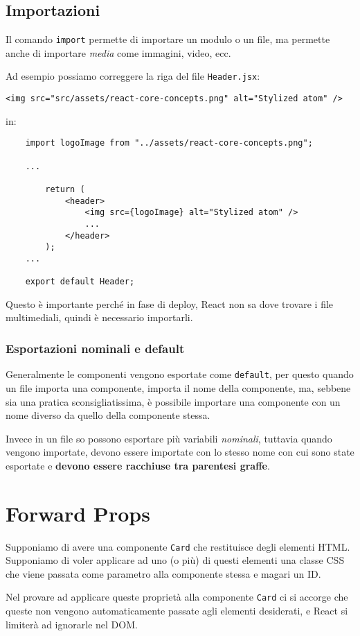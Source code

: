 \documentclass[12pt]{article}
\begin{document}
\subsection{Importazioni}
Il comando {\tt import} permette di importare un modulo o un file,
ma permette anche di importare {\it media} come immagini, video, ecc.

Ad esempio possiamo correggere la riga del file {\tt Header.jsx}:
\begin{verbatim}
<img src="src/assets/react-core-concepts.png" alt="Stylized atom" />
\end{verbatim}
in:
\begin{verbatim}
    import logoImage from "../assets/react-core-concepts.png";

    ...
    
        return (
            <header>
                <img src={logoImage} alt="Stylized atom" />
                ...
            </header>
        );
    ...
    
    export default Header;
\end{verbatim}
Questo è importante perché in fase di deploy, React non sa dove trovare i file
multimediali, quindi è necessario importarli.

\subsubsection{Esportazioni nominali e default}
Generalmente le componenti vengono esportate come {\tt default},
per questo quando un file importa una componente, importa il nome
della componente, ma, sebbene sia una pratica sconsigliatissima,
è possibile importare una componente con un nome diverso da quello
della componente stessa.

Invece in un file so possono esportare più variabili {\it nominali},
tuttavia quando vengono importate, devono essere importate con lo stesso
nome con cui sono state esportate e {\bf devono essere racchiuse tra parentesi graffe}.




\section{Forward Props}
Supponiamo di avere una componente {\tt Card} 
che restituisce degli elementi HTML. Supponiamo di voler
applicare ad uno (o più) di questi elementi una classe CSS
che viene passata come parametro alla componente stessa e magari
un ID.

Nel provare ad applicare queste proprietà alla componente
{\tt Card} ci si accorge che queste non vengono automaticamente
passate agli elementi desiderati, e React si limiterà 
ad ignorarle nel DOM.
\end{document}
